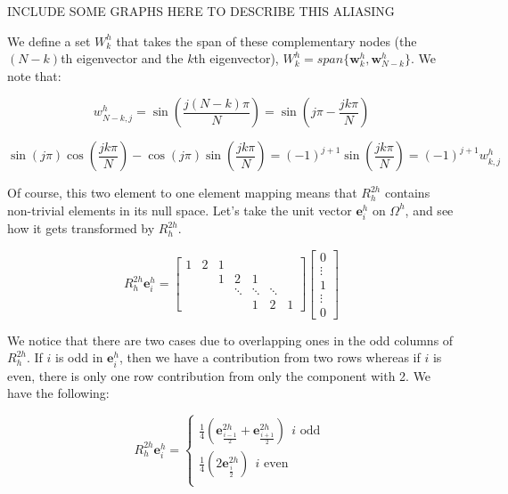 \documentclass[pdftex,12pt,a4paper]{article}
\begin{document}
INCLUDE SOME GRAPHS HERE TO DESCRIBE THIS ALIASING

We define a set $W_k^h$ that takes the span of these complementary nodes (the $(N-k)$th eigenvector and the $k$th eigenvector), $W_k^h = span \{ \mathbf{w}_k^h, \mathbf{w}_{N-k}^h\}$.  We note that: 

$$
w_{N-k, j}^h = \sin \left( \frac{j (N - k) \pi}{N} \right) = \sin\left( j\pi - \frac{jk \pi}{N}\right)
$$

$$
\sin(j \pi) \cos \left( \frac{jk \pi}{N} \right) - \cos(j \pi) \sin\left( \frac{jk \pi}{N} \right) =  (-1)^{j+1}\sin\left( \frac{jk \pi}{N} \right) = (-1)^{j+1} w_{k, j}^h
$$


Of course, this two element to one element mapping means that $R_h^{2h}$ contains non-trivial elements in its null space.  Let's take the unit vector $\mathbf{e}_i^h$ on $\Omega^h$, and see how it gets transformed by $R_h^{2h}$.  

\begin{equation}
R_h^{2h} \mathbf{e}_i^h = \begin{bmatrix}1 & 2 & 1 \\ & &  1  & 2 & 1 \\ & & & \ddots &\ddots & \ddots \\ & & & & 1 & 2 & 1 \end{bmatrix} \begin{bmatrix} 0 \\ \vdots \\ 1 \\ \vdots \\ 0 \end{bmatrix}
\end{equation}

We notice that there are two cases due to overlapping ones in the odd columns of $R_h^{2h}$.  If $i$ is odd in $\mathbf{e}_i^h$, then we have a contribution from two rows whereas if $i$ is even, there is only one row contribution from only the component with 2.  We have the following: 

\begin{equation}
R_h^{2h} \mathbf{e}_i^h = 
    \begin{cases}
    \frac 1 4 \left( \mathbf{e}_{ \frac{i-1}{2}}^{2h} + \mathbf{e}_{\frac{i+1}{2}}^{2h} \right) ~~ i \text{ odd }\\

    \frac 1 4 \left( 2 \mathbf{e}_{\frac{i}{2}}^{2h} \right) ~~ i \text{ even }\\
    \end{cases}
\end{equation}
\end{document}
